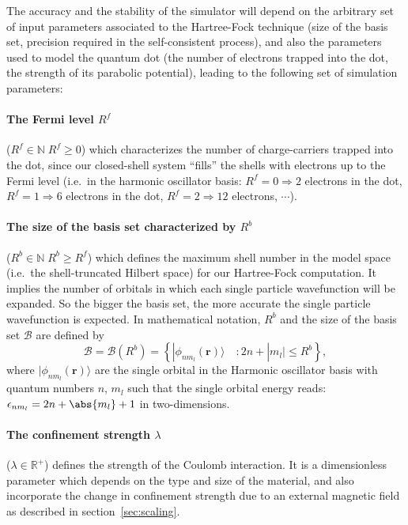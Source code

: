 The accuracy and the stability of the simulator will depend on the arbitrary set of input parameters associated to the Hartree-Fock technique (size of the basis set, precision required in the self-consistent process), and also the parameters used to model the quantum dot (the number of electrons trapped into the dot, the strength of its parabolic potential), leading to the following set of simulation parameters:

\paragraph{The Fermi level $R^f$}
 ($R^f\in\mathbb{N} \; R^f\geq 0$) which characterizes the number of charge-carriers trapped into the dot, since our closed-shell system ``fills'' the shells with electrons up to the Fermi level (i.e.\ in the harmonic oscillator basis: $R^f = 0 \Rightarrow 2$ electrons in the dot, $R^f=1 \Rightarrow 6$ electrons  in the dot, $R^f = 2 \Rightarrow 12$ electrons, $\cdots$).

\paragraph{The size of the basis set characterized by $R^b$} 
($R^b\in\mathbb{N} \; R^b\geq R^f$) which defines the maximum shell number in the model space (i.e.\ the shell-truncated Hilbert space) for our Hartree-Fock computation. It implies the number of orbitals in which each single particle wavefunction will be expanded. So the bigger the basis set, the more accurate the single particle wavefunction is expected. In mathematical notation, $R^b$ and the size of the basis set $\mathcal{B}$ are defined by
\begin{equation}
 \mathcal{B} = \mathcal{B}(R^b) = \left\{ | \phi_{n m_l}(\textbf{r})\rangle   \quad : 2n+ |m_l| \leq R^b  \right\},
\end{equation} 
where $| \phi_{n m_l}(\textbf{r})\rangle$ are the single orbital in the Harmonic oscillator basis with quantum numbers $n$, $m_l$ such that the single orbital energy reads: $\epsilon_{n m_l}=2n+\abs{m_l}+1$ in two-dimensions.

\paragraph{The confinement strength $\lambda$}  ($\lambda \in\mathbb{R^+}$) defines the strength of the Coulomb interaction. It is a dimensionless parameter which depends on the type and size of the material, and also  incorporate the change in confinement strength due to an external magnetic field as described in section~\ref{sec:scaling}.

